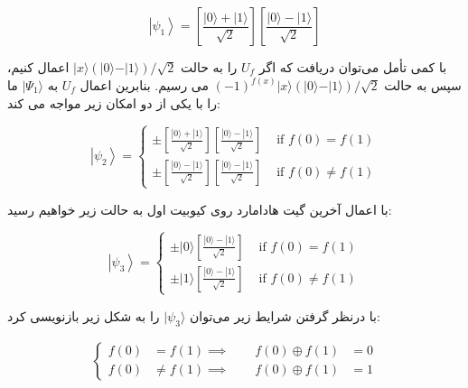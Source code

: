 \documentclass{book}
\begin{document}
\begin{center}
	\begin{equation}\label{first psi1 deutsch algorithm}
		\left|\psi_1\right\rangle=\left[\frac{|0\rangle+|1\rangle}{\sqrt{2}}\right]\left[\frac{|0\rangle-|1\rangle}{\sqrt{2}}\right]
	\end{equation}
\end{center}
با کمی تأمل می‌توان دریافت که اگر $U_{f}$ را به حالت $\vert x \rangle (\vert 0 \rangle - \vert 1 \rangle)/\sqrt{2}$ اعمال کنیم، سپس به حالت $(-1)^{f(x)}\vert x \rangle(\vert 0 \rangle - \vert 1 \rangle)/\sqrt{2}$ می رسیم. بنابرین اعمال $U_{f}$ به $\vert \Psi_{1} \rangle$ ما را با یکی از دو امکان زیر مواجه می کند:
\begin{center}
	\begin{equation}\label{first psi2 deutsch algorithm}
	\left|\psi_2\right\rangle= \begin{cases} \pm\left[\frac{|0\rangle+|1\rangle}{\sqrt{2}}\right]\left[\frac{|0\rangle-|1\rangle}{\sqrt{2}}\right] & \text { if } f(0)=f(1) \\ \pm\left[\frac{|0\rangle-|1\rangle}{\sqrt{2}}\right]\left[\frac{|0\rangle-|1\rangle}{\sqrt{2}}\right] & \text { if } f(0) \neq f(1) \end{cases}
\end{equation}
\end{center}
با اعمال آخرین گیت هادامارد روی کیوبیت اول به حالت زیر خواهیم رسید:
\begin{center}
	\begin{equation}\label{first psi3 deutsch algorithm}
	\left|\psi_3\right\rangle= \begin{cases} \pm|0\rangle\left[\frac{|0\rangle-|1\rangle}{\sqrt{2}}\right] & \text { if } f(0)=f(1) \\ \pm|1\rangle\left[\frac{|0\rangle-|1\rangle}{\sqrt{2}}\right] & \text { if } f(0) \neq f(1) \end{cases}
	\end{equation}
\end{center}
با درنظر گرفتن شرایط زیر می‌توان $\vert\psi_{3}\rangle$ را به شکل زیر بازنویسی کرد:
\begin{center}
\begin{equation}\label{key}
	\begin{aligned}
		\left\{
		\begin{aligned}
			f(0) &= f(1) 
			\implies \qquad f(0) \oplus f(1) &= 0\\
			f(0) &\neq f(1) 
			\implies \qquad f(0) \oplus f(1) &= 1
		\end{aligned}
		\right.
	\end{aligned}
\end{equation}
\end{center}
\end{document}
